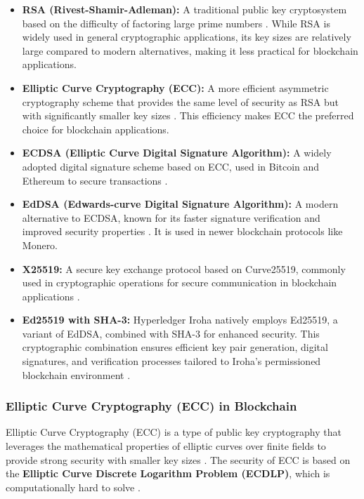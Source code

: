 \documentclass{article}
\begin{document}
\begin{itemize}
    \item \textbf{RSA (Rivest-Shamir-Adleman):} A traditional public key cryptosystem based on the difficulty of factoring large prime numbers \cite{rivest1978method}. While RSA is widely used in general cryptographic applications, its key sizes are relatively large compared to modern alternatives, making it less practical for blockchain applications.
    \item \textbf{Elliptic Curve Cryptography (ECC):} A more efficient asymmetric cryptography scheme that provides the same level of security as RSA but with significantly smaller key sizes \cite{miller1986use}. This efficiency makes ECC the preferred choice for blockchain applications.
    \item \textbf{ECDSA (Elliptic Curve Digital Signature Algorithm):} A widely adopted digital signature scheme based on ECC, used in Bitcoin and Ethereum to secure transactions \cite{johnson2001elliptic}.
    \item \textbf{EdDSA (Edwards-curve Digital Signature Algorithm):} A modern alternative to ECDSA, known for its faster signature verification and improved security properties \cite{bernstein2012high}. It is used in newer blockchain protocols like Monero.
    \item \textbf{X25519:} A secure key exchange protocol based on Curve25519, commonly used in cryptographic operations for secure communication in blockchain applications \cite{langley2016curve25519}.
    \item \textbf{Ed25519 with SHA-3:} Hyperledger Iroha natively employs Ed25519, a variant of EdDSA, combined with SHA-3 for enhanced security. This cryptographic combination ensures efficient key pair generation, digital signatures, and verification processes tailored to Iroha’s permissioned blockchain environment \cite{hyperledger_iroha}.
\end{itemize}

\subsubsection{Elliptic Curve Cryptography (ECC) in Blockchain}
Elliptic Curve Cryptography (ECC) is a type of public key cryptography that leverages the mathematical properties of elliptic curves over finite fields to provide strong security with smaller key sizes \cite{koblitz1987elliptic}. The security of ECC is based on the \textbf{Elliptic Curve Discrete Logarithm Problem (ECDLP)}, which is computationally hard to solve \cite{hankerson2006guide}.
\end{document}
